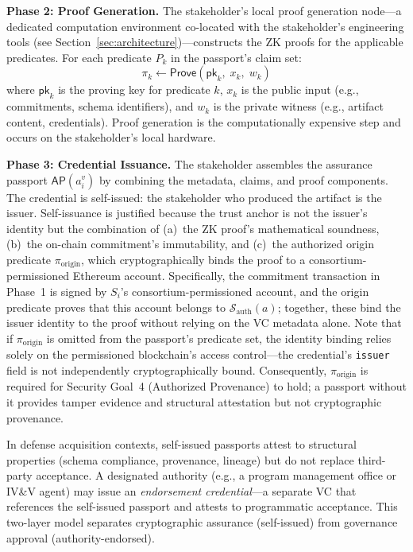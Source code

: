 \textbf{Phase 2: Proof Generation.}
The stakeholder's local proof generation node---a dedicated computation environment co-located with the stakeholder's engineering tools (see Section~\ref{sec:architecture})---constructs the ZK proofs for the applicable predicates.
For each predicate $P_k$ in the passport's claim set:
\begin{equation}
\label{eq:proof-gen}
\pi_k \leftarrow \textsf{Prove}(\mathsf{pk}_k,\; x_k,\; w_k)
\end{equation}
where $\mathsf{pk}_k$ is the proving key for predicate $k$, $x_k$ is the public input (e.g., commitments, schema identifiers), and $w_k$ is the private witness (e.g., artifact content, credentials).
Proof generation is the computationally expensive step and occurs on the stakeholder's local hardware.

\textbf{Phase 3: Credential Issuance.}
The stakeholder assembles the assurance passport $\mathsf{AP}(a_i^{v})$ by combining the metadata, claims, and proof components.
The credential is self-issued: the stakeholder who produced the artifact is the issuer.
Self-issuance is justified because the trust anchor is not the issuer's identity but the combination of (a)~the ZK proof's mathematical soundness, (b)~the on-chain commitment's immutability, and (c)~the authorized origin predicate $\pi_{\text{origin}}$, which cryptographically binds the proof to a consortium-permissioned Ethereum account.
Specifically, the commitment transaction in Phase~1 is signed by $S_i$'s consortium-permissioned account, and the origin predicate proves that this account belongs to $\mathcal{S}_{\text{auth}}(a)$; together, these bind the issuer identity to the proof without relying on the VC metadata alone.
Note that if $\pi_{\text{origin}}$ is omitted from the passport's predicate set, the identity binding relies solely on the permissioned blockchain's access control---the credential's \texttt{issuer} field is not independently cryptographically bound.
Consequently, $\pi_{\text{origin}}$ is required for Security Goal~4 (Authorized Provenance) to hold; a passport without it provides tamper evidence and structural attestation but not cryptographic provenance.

In defense acquisition contexts, self-issued passports attest to structural properties (schema compliance, provenance, lineage) but do not replace third-party acceptance.
A designated authority (e.g., a program management office or IV\&V agent) may issue an \emph{endorsement credential}---a separate VC that references the self-issued passport and attests to programmatic acceptance.
This two-layer model separates cryptographic assurance (self-issued) from governance approval (authority-endorsed).

